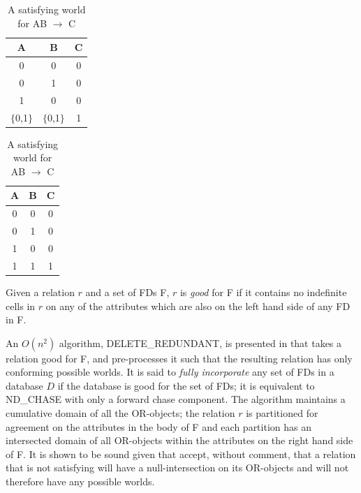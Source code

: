 {\line
\begin{table}[ht]
\begin{minipage}[b]{7cm}
\begin{center}
\begin{tabular}{|c|c|c|} \hline
 {\bf A} & {\bf B} & {\bf C} \\\hline
 0 & 0 & 0 \\ 
 0 & 1 & 0 \\ 
 1 & 0 & 0 \\ 
 $\{$0,1$\}$ & $\{$0,1$\}$ & 1 \\ \hline
\end{tabular}
\end{center}
\caption{\label{tbl:backchase1}Indefinite relation $r$, FD AB $\to$ C} 
\end{minipage}
\hfill
\begin{minipage}[b]{7cm}
\begin{center}
\begin{tabular}{|c|c|c|} \hline
 {\bf A} & {\bf B} & {\bf C} \\\hline
 0 & 0 & 0 \\ 
 0 & 1 & 0 \\ 
 1 & 0 & 0 \\ 
 1 & 1 & 1 \\ \hline
\end{tabular}
\end{center}
\caption{\label{tbl:backchase2}A satisfying world for AB $\to$ C} 
\end{minipage}
\end{table}
}

\begin{definition}\label{cp:def_good}
\begin{rm}
Given a relation $r$ and a set of FDs F,
$r$ is { \em good} for F if it contains no indefinite cells in $r$ on any
of the attributes which are also on the left hand side of any FD in F. 
\end{rm}
\end{definition}
\smallskip
An $O(n^2)$ algorithm, DELETE\_REDUNDANT, is presented in \cite{vn95} that takes a relation good for F, and
pre-processes it such that the resulting relation has only conforming
possible worlds.  It is said to {\em fully incorporate} any set of FDs in
a database $D$ if the database is good for the set of FDs; it is
equivalent to ND\_CHASE with 
only a forward chase component. The algorithm maintains a cumulative
domain of all the OR-objects; the relation $r$ is partitioned for
agreement on the attributes in the body of F and each partition
has an intersected domain of all OR-objects within the attributes
on the right hand side of F. It is shown to be
sound given that \cite{vn95} accept, without comment, that a
relation that is not satisfying will have a null-intersection on its
OR-objects and will not therefore have any possible worlds.\\


